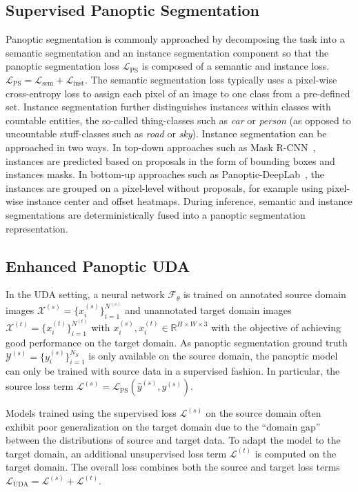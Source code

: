 \documentclass[10pt,twocolumn,letterpaper]{article}
\newcommand{\sem}{\mathrm{sem}}
\begin{document}
\subsection{Supervised Panoptic Segmentation}

Panoptic segmentation is commonly approached by decomposing the task into a semantic segmentation and an instance segmentation component so that the panoptic segmentation loss $\mathcal{L}_\mathrm{PS}$ is composed of a semantic and instance loss. $\mathcal{L}_\mathrm{PS} = \mathcal{L}_\sem + \mathcal{L}_\mathrm{inst}$. The semantic segmentation loss typically uses a pixel-wise cross-entropy loss to assign each pixel of an image to one class from a pre-defined set.
Instance segmentation further distinguishes instances within classes with countable entities, the so-called thing-classes such as \emph{car} or \emph{person} (as opposed to uncountable stuff-classes such as \emph{road} or \emph{sky}). Instance segmentation can be approached in two ways. In top-down approaches such as Mask R-CNN~\cite{he2017mask}, instances are predicted based on proposals in the form of bounding boxes and instances masks. In bottom-up approaches such as Panoptic-DeepLab~\cite{cheng2019panoptic}, the instances are grouped on a pixel-level without proposals, for example using pixel-wise instance center and offset heatmaps.
During inference, semantic and instance segmentations are deterministically fused into a panoptic segmentation representation.

\subsection{Enhanced Panoptic UDA}
In the UDA setting, a neural network $\mathcal{F}_{\theta}$ is trained on annotated source domain images 
$\mathcal{X}^{(s)} = \{x_i^{(s)}\}_{i=1}^{N^{(s)}}$ 
and unannotated target domain images 
$\mathcal{X}^{(t)} = \{x_i^{(t)}\}_{i=1}^{N^{(t)}}$ 
with $x_i^{(s)}, x_i^{(t)} \in \mathbb{R}^{H \times W \times 3}$
with the objective of achieving good performance on the target domain.
As panoptic segmentation ground truth $\mathcal{Y}^{(s)} = \{y^{(s)}_i\}_{i=1}^{N_S}$ is only available on the source domain, the panoptic model can only be trained with source data in a supervised fashion. In particular, the source loss term $\mathcal{L}^{(s)} = \mathcal{L}_\mathrm{PS}(\hat{y}^{(s)}, y^{(s)})$.

Models trained using the supervised loss $\mathcal{L}^{(s)}$ on the source domain often exhibit poor generalization on the target domain due to the ``domain gap'' between the distributions of source and target data.
To adapt the model to the target domain, an additional unsupervised loss term $\mathcal{L}^{(t)}$ is computed on the target domain.
The overall loss combines both the source and target loss terms $\mathcal{L}_\mathrm{UDA} = \mathcal{L}^{(s)} + \mathcal{L}^{(t)}$.
\end{document}
